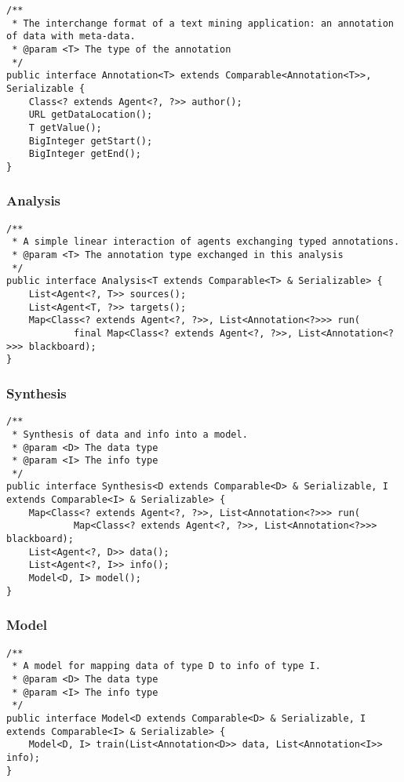 \documentclass[abstracton, 12pt]{scrartcl}
\begin{document}
\begin{lstlisting}
/**
 * The interchange format of a text mining application: an annotation of data with meta-data.
 * @param <T> The type of the annotation
 */
public interface Annotation<T> extends Comparable<Annotation<T>>, Serializable {
    Class<? extends Agent<?, ?>> author();
    URL getDataLocation();
    T getValue();
    BigInteger getStart();
    BigInteger getEnd();
}
\end{lstlisting}

\subsubsection{Analysis}

\begin{lstlisting}
/**
 * A simple linear interaction of agents exchanging typed annotations.
 * @param <T> The annotation type exchanged in this analysis
 */
public interface Analysis<T extends Comparable<T> & Serializable> {
    List<Agent<?, T>> sources();
    List<Agent<T, ?>> targets();
    Map<Class<? extends Agent<?, ?>>, List<Annotation<?>>> run(
            final Map<Class<? extends Agent<?, ?>>, List<Annotation<?>>> blackboard);
}
\end{lstlisting}

\subsubsection{Synthesis}

\lstset{language=Java}
\begin{lstlisting}
/**
 * Synthesis of data and info into a model.
 * @param <D> The data type
 * @param <I> The info type
 */
public interface Synthesis<D extends Comparable<D> & Serializable, I extends Comparable<I> & Serializable> {
    Map<Class<? extends Agent<?, ?>>, List<Annotation<?>>> run(
            Map<Class<? extends Agent<?, ?>>, List<Annotation<?>>> blackboard);
    List<Agent<?, D>> data();
    List<Agent<?, I>> info();
    Model<D, I> model();
}
\end{lstlisting}

\subsubsection{Model}

\begin{lstlisting}
/**
 * A model for mapping data of type D to info of type I.
 * @param <D> The data type
 * @param <I> The info type
 */
public interface Model<D extends Comparable<D> & Serializable, I extends Comparable<I> & Serializable> {
    Model<D, I> train(List<Annotation<D>> data, List<Annotation<I>> info);
}
\end{lstlisting}
\end{document}
